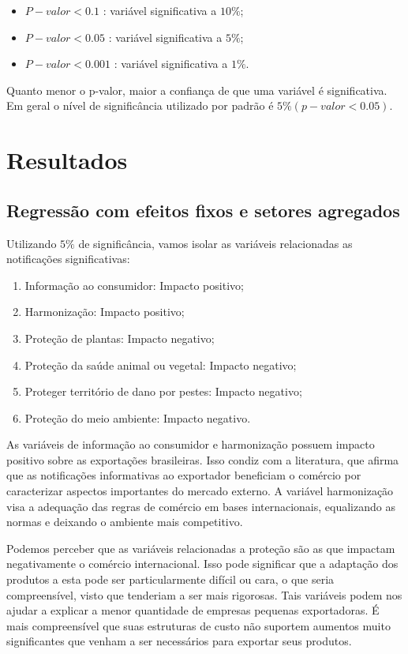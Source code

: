 \documentclass[12pt, a4paper]{article}
\begin{document}
\begin{itemize}
    \item $P-valor < 0.1$ : variável significativa a $10\%$;
    \item $P-valor < 0.05$ : variável significativa a $5\%$;
    \item $P-valor < 0.001$ : variável significativa a $1\%$.
\end{itemize}

Quanto menor o p-valor, maior a confiança de que uma variável é significativa. Em geral o nível de significância utilizado por padrão é $5\% (p-valor < 0.05)$.


\newpage
\section{Resultados}

\subsection{Regressão com efeitos fixos e setores agregados}



 Utilizando $5\%$ de significância, vamos isolar as variáveis relacionadas as notificações significativas:

\begin{enumerate}
    \item Informação ao consumidor: Impacto positivo;
    \item Harmonização: Impacto positivo;
    \item Proteção de plantas: Impacto negativo;
    \item Proteção da saúde animal ou vegetal: Impacto negativo;
    \item Proteger território de dano por pestes: Impacto negativo;
    \item Proteção do meio ambiente: Impacto negativo.
\end{enumerate}

 As variáveis de informação ao consumidor e harmonização possuem impacto positivo sobre as exportações brasileiras. Isso condiz com a literatura, que afirma que as notificações informativas ao exportador beneficiam o comércio por caracterizar aspectos importantes do mercado externo. A variável harmonização visa a adequação das regras de comércio em bases internacionais, equalizando as normas e deixando o ambiente mais competitivo. 

Podemos perceber que as variáveis relacionadas a proteção são as que impactam negativamente o comércio internacional. Isso pode significar que a adaptação dos produtos a esta pode ser particularmente difícil ou cara, o que seria compreensível, visto que tenderiam a ser mais rigorosas. Tais variáveis podem nos ajudar a explicar a menor quantidade de empresas pequenas exportadoras. É mais compreensível que suas estruturas de custo não suportem aumentos muito significantes que venham a ser necessários para exportar seus produtos.




% 


\printbibliography
\end{document}
